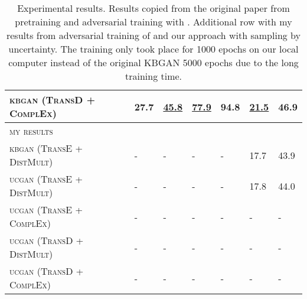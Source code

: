 \begin{table}[h]
\begin{tabular}{lllllll}
        \textsc{kbgan} (\textsc{TransD} + \textsc{ComplEx})   
        & 27.7 & \textbf{\underline{45.8}} & \underline{77.9}
        & 94.8 & \underline{21.5} & 46.9\\
        
         \midrule
         
         \textsc{my results} 
          &  &  &  &  &  & \\
          
          \textsc{kbgan} (\textsc{TransE} + \textsc{DistMult})  & -  & - & - & - & 17.7 & 43.9 \\
          
          \midrule
         
          \textsc{ucgan} (\textsc{TransE} + \textsc{DistMult}) 
          & -  & - & - & - & 17.8 & 44.0\\
         
         \textsc{ucgan} (\textsc{TransE} + \textsc{ComplEx}) 
          & -  & - & - & - & - & - \\
          
          \textsc{ucgan} (\textsc{TransD} + \textsc{DistMult}) 
          & -  & - & - & - & - & - \\
        
        \textsc{ucgan} (\textsc{TransD} + \textsc{ComplEx}) 
          & -  & - & - & - & - & - \\
          
        \bottomrule
    \end{tabular}
    \caption{Experimental results.
    Results copied from the original paper \cite{cai2017kbgan} from pretraining and adversarial training with \kbgan. 
    Additional row with my results from adversarial training of \kbgan and our approach with sampling by uncertainty.
    The training only took place for 1000 epochs on our local computer instead of the original KBGAN 5000 epochs due to the long training time.}
\label{tab:results}
\end{table}
